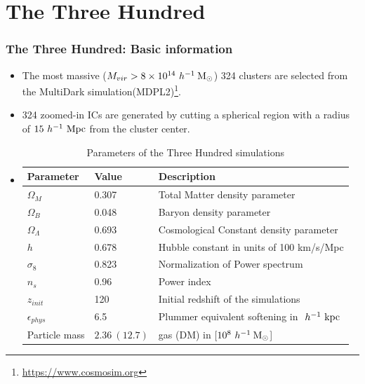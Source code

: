 \documentclass[aspectratio=43]{beamer}
\newcommand{\hMsun}{~h^{-1}\>{\rm M_\odot}}
\newcommand{\Mpc}{~h^{-1}~{\rm Mpc}}
\newcommand{\Kpc}{~h^{-1}~{\rm kpc}}
\begin{document}
\section{The Three Hundred}
\begin{frame}
  \frametitle{The Three Hundred: Basic information}
  \begin{itemize}
    \item The most massive ($M_{vir} > 8\times 10^{14} \hMsun$) 324 clusters are selected from the MultiDark simulation(MDPL2)\footnote{\url{https://www.cosmosim.org}}.
    \item 324 zoomed-in ICs are generated by cutting a spherical region with a radius of \alert{$15 \Mpc$} from the cluster center.
    \item[]
      \begin{table}
        \fontsize{10}{10}\selectfont
        \caption{Parameters of the Three Hundred simulations}
        \begin{tabular}{lll}
          \hline
          Parameter& Value & Description\\
          \hline
          $\Omega_M$ & 0.307 & Total Matter density parameter\\
          $\Omega_B$ & 0.048 & Baryon density parameter\\
          $\Omega_\Lambda$ & 0.693 & Cosmological Constant density parameter\\
          $h$ & 0.678  & Hubble constant in units of 100 km/s/Mpc\\
          $\sigma_8$ & 0.823 & Normalization of Power spectrum\\
          $n_s$ & 0.96  & Power index\\
          $z_{init}$ & 120 & Initial redshift of the simulations \\
          $\epsilon_{phys}$ & 6.5 & Plummer equivalent softening in $\Kpc$ \\
          Particle mass & $2.36 \ (12.7) $ & gas (DM) in [$10^8 \hMsun$]\\
          \hline
        \end{tabular}
      \end{table}
\end{itemize}
\end{frame}
\end{document}

